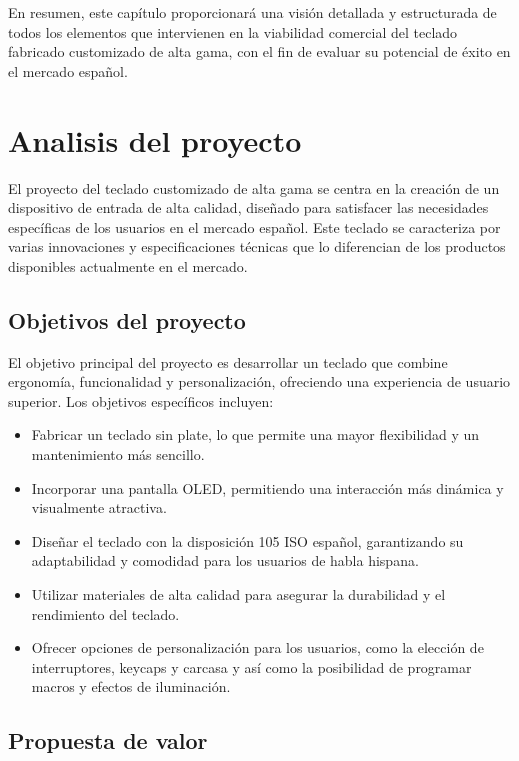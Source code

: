 En resumen, este capítulo proporcionará una visión detallada y estructurada de todos los elementos que intervienen en la viabilidad comercial del teclado fabricado customizado de alta gama, con el fin de evaluar su potencial de éxito en el mercado español.

\section{Analisis del proyecto}

El proyecto del teclado customizado de alta gama se centra en la creación de un dispositivo de entrada de alta calidad, diseñado para satisfacer las necesidades específicas de los usuarios en el mercado español. Este teclado se caracteriza por varias innovaciones y especificaciones técnicas que lo diferencian de los productos disponibles actualmente en el mercado.

\subsection{Objetivos del proyecto}

El objetivo principal del proyecto es desarrollar un teclado que combine ergonomía, funcionalidad y personalización, ofreciendo una experiencia de usuario superior. Los objetivos específicos incluyen:

\begin{itemize}
    \item Fabricar un teclado sin plate, lo que permite una mayor flexibilidad y un mantenimiento más sencillo.
    \item Incorporar una pantalla OLED, permitiendo una interacción más dinámica y visualmente atractiva.
    \item Diseñar el teclado con la disposición 105 ISO español, garantizando su adaptabilidad y comodidad para los usuarios de habla hispana.
    \item Utilizar materiales de alta calidad para asegurar la durabilidad y el rendimiento del teclado.
    \item Ofrecer opciones de personalización para los usuarios, como la elección de interruptores, keycaps y carcasa y así como la posibilidad de programar macros y efectos de iluminación.
\end{itemize}

\subsection{Propuesta de valor}

